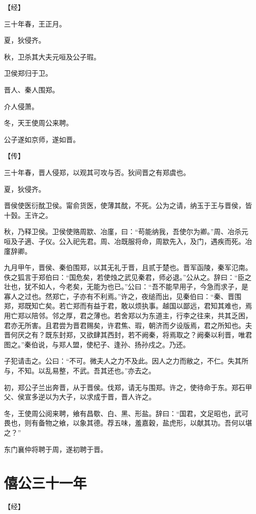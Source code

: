 \documentclass[a4paper,12pt,UTF8,twoside]{ctexbook}
\begin{document}
【经】

三十年春，王正月。

夏，狄侵齐。

秋，卫杀其大夫元咺及公子瑕。

卫侯郑归于卫。

晋人、秦人围郑。

介人侵萧。

冬，天王使周公来聘。

公子遂如京师，遂如晋。

【传】

三十年春，晋人侵郑，以观其可攻与否。狄间晋之有郑虞也。



夏，狄侵齐。

晋侯使医衍酖卫侯。甯俞货医，使薄其酖，不死。公为之请，纳玉于王与晋侯，皆十瑴。王许之。

秋，乃释卫侯。卫侯使赂周歂、冶廑，曰：“苟能纳我，吾使尔为卿。”周、冶杀元咺及子適、子仪。公入祀先君。周、冶既服将命，周歂先入，及门，遇疾而死。冶廑辞卿。

九月甲午，晋侯、秦伯围郑，以其无礼于晋，且贰于楚也。晋军函陵，秦军氾南。佚之狐言于郑伯曰：“国危矣，若使烛之武见秦君，师必退。”公从之。辞曰：“臣之壮也，犹不如人，今老矣，无能为也已。”公曰：“吾不能早用子，今急而求子，是寡人之过也。然郑亡，子亦有不利焉。”许之，夜缒而出，见秦伯曰：“秦、晋围郑，郑既知亡矣。若亡郑而有益于君，敢以烦执事。越国以鄙远，君知其难也，焉用亡郑以陪邻。邻之厚，君之薄也。若舍郑以为东道主，行李之往来，共其乏困，君亦无所害。且君尝为晋君赐矣，许君焦、瑕，朝济而夕设版焉，君之所知也。夫晋何厌之有？既东封郑，又欲肆其西封，若不阙秦，将焉取之？阙秦以利晋，唯君图之。”秦伯说，与郑人盟，使杞子、逢孙、扬孙戍之。乃还。

子犯请击之。公曰：“不可。微夫人之力不及此。因人之力而敝之，不仁。失其所与，不知。以乱易整，不武。吾其还也。”亦去之。

初，郑公子兰出奔晋，从于晋侯。伐郑，请无与围郑。许之，使待命于东。郑石甲父、侯宣多逆以为大子，以求成于晋，晋人许之。

冬，王使周公阅来聘，飨有昌歜、白、黑、形盐。辞曰：“国君，文足昭也，武可畏也，则有备物之飨，以象其德。荐五味，羞嘉穀，盐虎形，以献其功。吾何以堪之？”

东门襄仲将聘于周，遂初聘于晋。

\section{僖公三十一年}


【经】
\end{document}
